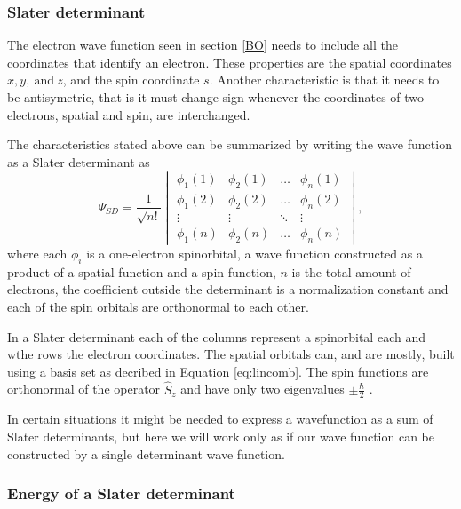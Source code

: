 \documentclass[../master_thesis.tex]{subfiles}
\begin{document}
\subsubsection{Slater determinant}
The electron wave function seen in section \ref{BO} needs to include all the
coordinates that identify an electron. These properties are the spatial coordinates
$x, y,\  \text{and}\ z$, and the spin coordinate $s$. Another characteristic is that
it needs to be antisymetric, that is it must change sign whenever the coordinates
of two electrons, spatial and spin, are interchanged\cite{}.

The characteristics stated above can be summarized by writing the wave function as
a Slater determinant as \cite{Cramer:2004, Jensen:1999}
\begin{equation}
  \Psi_{SD} = \frac{1}{\sqrt{n!}}
  \begin{vmatrix}
    \phi_1(1) & \phi_2(1) & \ldots & \phi_n(1)\\
    \phi_1(2) & \phi_2(2) & \ldots & \phi_n(2)\\
    \vdots & \vdots & \ddots & \vdots \\
    \phi_1(n) & \phi_2(n) & \ldots & \phi_n(n)
  \end{vmatrix},
\end{equation}
where each $\phi_i$ is a one-electron spinorbital, a wave function constructed as
a product of a spatial function and a spin function\cite{Jensen:1999}, $n$ is the total amount of
electrons, the coefficient outside the determinant is a normalization constant
and each of the spin orbitals are orthonormal to each other.

In a Slater determinant each of the columns represent a spinorbital each and wthe rows the electron coordinates.
The spatial orbitals can, and are mostly, built using a basis set as decribed in
Equation \ref{eq:lincomb}. The spin functions are orthonormal \eifuncs of the operator $\hat{S}_z$
and have only two eigenvalues $\pm \frac{\hbar}{2}$ \cite{Cramer:2004}.

In certain situations it might be needed to express a wavefunction as a sum of Slater
determinants, but here we will work only as if our wave function can be constructed by
a single determinant wave function.

\subsubsection{Energy of a Slater determinant}
\end{document}
